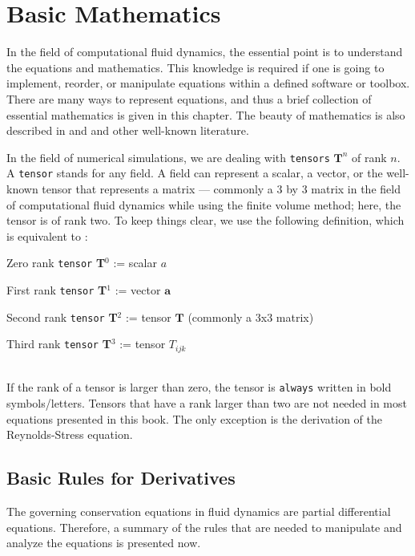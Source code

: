 %
%
\chapter{Basic Mathematics}
\label{CHAPTER::Mathematics}
%
%
%
    In the field of computational fluid dynamics, the essential point is to
    understand the equations and mathematics. This knowledge is required if one
    is going to implement, reorder, or manipulate equations within a defined
    software or toolbox. There are many ways to represent equations, and thus a
    brief collection of essential mathematics is given in this chapter. The
    beauty of mathematics is also described in \cite{JasakPhD, Rappaz, ProgrammersGuide}
    and \cite{Moukalled15} and other well-known literature.


    In the field of numerical simulations, we are dealing with \texttt{tensors}
    $\textbf{T}^n$ of rank $n$. A \texttt{tensor} stands for any field. A field
    can represent a scalar, a vector, or the well-known tensor that represents
    a matrix --- commonly a 3 by 3 matrix in the field of computational fluid
    dynamics while using the finite volume method; here, the tensor is of rank
    two. To keep things clear, we use the following definition, which is
    equivalent to \cite{ProgrammersGuide}:
%
%
	\vspace{0.5cm}

	Zero rank \texttt{tensor} \textbf{T}$^0$ := scalar $a$

	First rank \texttt{tensor} \textbf{T}$^1$ := vector $\textbf{a}$

	Second rank \texttt{tensor} \textbf{T}$^2$ := tensor $\textbf{T}$ (commonly a 3x3 matrix)

	Third rank \texttt{tensor} \textbf{T}$^3$ := tensor $T_{ijk}$

	~\\
%
%
	If the rank of a tensor is larger than zero, the tensor is \texttt{always}
    written in bold symbols/letters. Tensors that have a rank larger than two
    are not needed in most equations presented in this book. The only exception
    is the derivation of the Reynolds-Stress equation.
%
%
\section{Basic Rules for Derivatives}
%
%
	The governing conservation equations in fluid dynamics are partial
    differential equations. Therefore, a summary of the rules that are needed
    to manipulate and analyze the equations is presented now.


